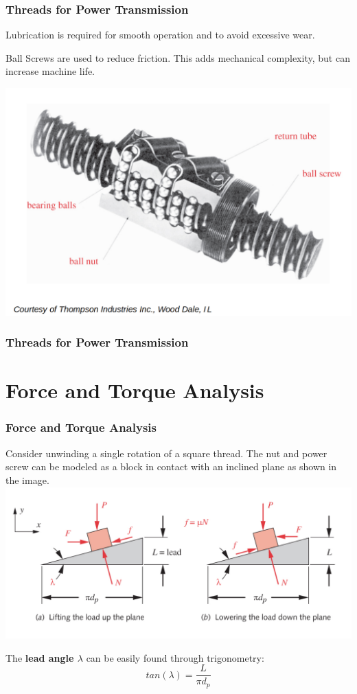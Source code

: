 \documentclass[fleqn]{beamer} %
\newcommand{\sectiontitleII}{Threads for Power Transmission}
\newcommand{\sectiontitleIII}{Force and Torque Analysis}
\begin{document}
	\begin{frame}[label=sectionII] \small
		\frametitle{\sectiontitleII}

		Lubrication is required for smooth operation and to avoid excessive wear.

		Ball Screws are used to reduce friction. This adds mechanical complexity, but can increase machine life.

		\includegraphics[scale=.15]{images/figure_15_9.png}

	\end{frame}

	\begin{frame}[label=sectionII] \small
		\frametitle{\sectiontitleII}
		
	
	\end{frame}

	
\section{\sectiontitleIII}	

	\begin{frame}[label=sectionIII] \small
		\frametitle{\sectiontitleIII}
	 		
	 	Consider unwinding a single rotation of a square thread. The nut and power screw can be modeled as a block in contact with an inclined plane as shown in the image.	
		\includegraphics[scale=.15]{images/figure_15_6.png}

		The {\bf lead angle $\lambda$} can be easily found through trigonometry: \[ tan(\lambda) =\frac{L}{\pi d_p} \]
	        
	\end{frame}  
\end{document}

